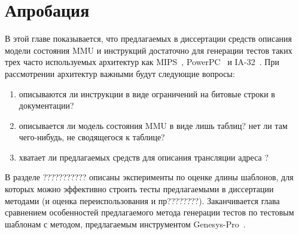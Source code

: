 \documentclass[14pt]{extreport}
\begin{document}

\chapter{Апробация}

В этой главе показывается, что предлагаемых в диссертации средств
описания модели состояния MMU и инструкций достаточно для генерации
тестов таких трех часто используемых архитектур как MIPS~\cite{mips64_II},
PowerPC~\cite{??????????????} и IA-32~\cite{???????????????}. При
рассмотрении архитектур важными будут следующие вопросы:
\begin{enumerate}
    \item описываются ли инструкции в виде ограничений на битовые
    строки в документации?
    \item описывается ли модель состояния MMU в виде лишь таблиц? нет ли там чего-нибудь, не сводящегося к таблице?
    \item хватает ли предлагаемых средств для описания трансляции адреса ?
\end{enumerate}

В разделе ??????????? описаны эксперименты по оценке длины шаблонов, для
которых можно эффективно строить тесты предлагаемыми в диссертации
методами (и оценка переиспользования и пр????????). Заканчивается глава
сравнением особенностей предлагаемого метода генерации тестов по
тестовым шаблонам с методом, предлагаемым инструментом
Genesys-Pro~\cite{????????????????}.

\end{document}
